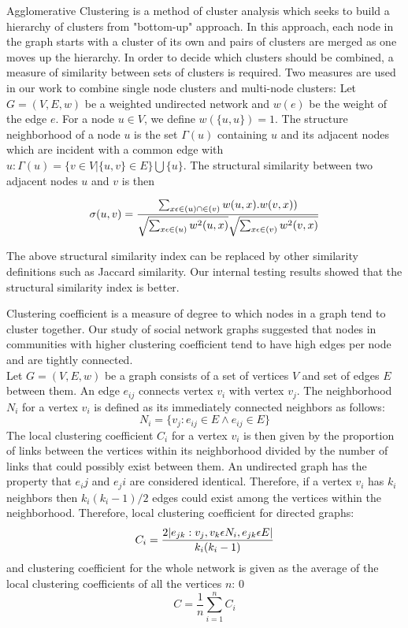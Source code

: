 Agglomerative Clustering is a method of cluster analysis which seeks to build a hierarchy of clusters from "bottom-up" approach. In this approach, each node in the graph starts with a cluster of its own and pairs of clusters are merged as one moves up the hierarchy. In order to decide which clusters should be combined, a measure of similarity between sets of clusters is required. Two measures are used in our work to combine single node clusters and multi-node clusters:
Let $ G = (V,E,w) $ be a weighted undirected network and $ w(e) $ be the weight of the edge $ e $. For a node $ u \in V $, we define $ w(\{u,u\}) = 1 $. The structure neighborhood of a node $ u $ is the set $ \Gamma(u) $ containing $ u $ and its adjacent nodes which are incident with a common edge with $ u : \Gamma(u) = \{v \in V|\{u,v\} \in E\} \bigcup \{u\}$. The structural similarity between two adjacent nodes $ u $ and $ v $ is then
	
	$$\large \sigma (u,v) = \frac{\sum_{x \epsilon \in (u)\cap \in (v)} w(u,x).w(v,x))}{\sqrt{\sum_{x\epsilon \in (u)}w^2(u,x)}\sqrt{\sum_{x\epsilon \in (v)}w^2(v,x)}}$$
	
	The above structural similarity index can be replaced by other similarity definitions such as Jaccard similarity. Our internal testing results showed that the structural similarity index is better.

Clustering coefficient is a measure of degree to which nodes in a graph tend to cluster together. Our study of social network graphs suggested that nodes in communities with higher clustering coefficient tend to have high edges per node and are tightly connected.\\
	Let $ G = (V,E,w)$ be a graph consists of a set of vertices $ V $ and set of edges $ E $ between them. An edge $ e_{ij} $ connects vertex $ v_i $ with vertex $ v_j $. The neighborhood $ N_i $ for a vertex $ v_i $ is defined as its immediately connected neighbors as follows: 
	$$ N_i = \{ v_j: e_{ij} \in E \wedge e_{ij} \in E \}$$
	The local clustering coefficient $ C_i $ for a vertex $ v_i $ is then given by the proportion of links between the vertices within its neighborhood divided by the number of links that could possibly exist between them. An undirected graph has the property that $ e_ij $ and $ e_ji $ are considered identical. Therefore, if a vertex $ v_i $ has $ k_i $ neighbors then $ k_i(k_i - 1)/2 $ edges could exist among the vertices within the neighborhood. Therefore, local clustering coefficient for directed graphs: 
		$$\large C_i = \frac{2|{e_{jk}:v_j, v_k \epsilon N_i, e_{jk} \epsilon E}|}{k_i(k_i-1)}$$
	and clustering coefficient for the whole network is given as the average of the local clustering coefficients of all the vertices $ n $:
0		$$ C = \frac{1}{n} \sum_{i=1}^{n} C_i$$


